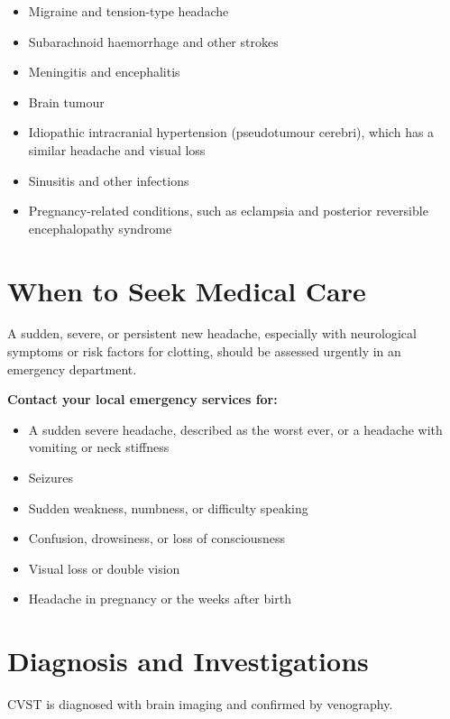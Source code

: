 \begin{itemize}
    \item Migraine and tension-type headache
    \item Subarachnoid haemorrhage and other strokes
    \item Meningitis and encephalitis
    \item Brain tumour
    \item Idiopathic intracranial hypertension (pseudotumour cerebri), which has a similar headache and visual loss
    \item Sinusitis and other infections
    \item Pregnancy-related conditions, such as eclampsia and posterior reversible encephalopathy syndrome
\end{itemize}

\section*{When to Seek Medical Care}
A sudden, severe, or persistent new headache, especially with neurological symptoms or risk factors for clotting, should be assessed urgently in an emergency department.

\textbf{Contact your local emergency services for:}
\begin{itemize}
    \item A sudden severe headache, described as the worst ever, or a headache with vomiting or neck stiffness
    \item Seizures
    \item Sudden weakness, numbness, or difficulty speaking
    \item Confusion, drowsiness, or loss of consciousness
    \item Visual loss or double vision
    \item Headache in pregnancy or the weeks after birth
\end{itemize}

\section*{Diagnosis and Investigations}
CVST is diagnosed with brain imaging and confirmed by venography.

